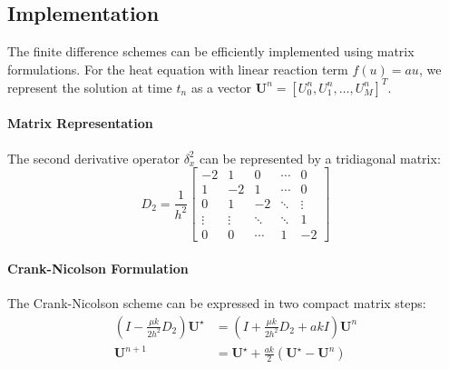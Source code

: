 
\subsection{Implementation}

The finite difference schemes can be efficiently implemented using matrix formulations. For the heat equation with linear reaction term $f(u) = au$, we represent the solution at time $t_n$ as a vector $\mathbf{U}^n = [U_0^n, U_1^n, \ldots, U_M^n]^T$.

\paragraph{Matrix Representation}
The second derivative operator $\delta_x^2$ can be represented by a tridiagonal matrix:
\begin{equation}
  D_2 = \frac{1}{h^2}
  \begin{bmatrix}
    -2 & 1 & 0 & \cdots & 0 \\
    1 & -2 & 1 & \cdots & 0 \\
    0 & 1 & -2 & \ddots & \vdots \\
    \vdots & \vdots & \ddots & \ddots & 1 \\
    0 & 0 & \cdots & 1 & -2
  \end{bmatrix}
\end{equation}

\paragraph{Crank-Nicolson Formulation}
The Crank-Nicolson scheme can be expressed in two compact matrix steps:
\begin{align}
  (I - \frac{\mu k}{2h^2}D_2) \mathbf{U}^{\star} &= (I + \frac{\mu k}{2h^2}D_2 + akI) \mathbf{U}^n \tag{Predictor} \\
  \mathbf{U}^{n+1} &= \mathbf{U}^{\star} + \frac{ak}{2}(\mathbf{U}^{\star} - \mathbf{U}^n) \tag{Corrector}
\end{align}

